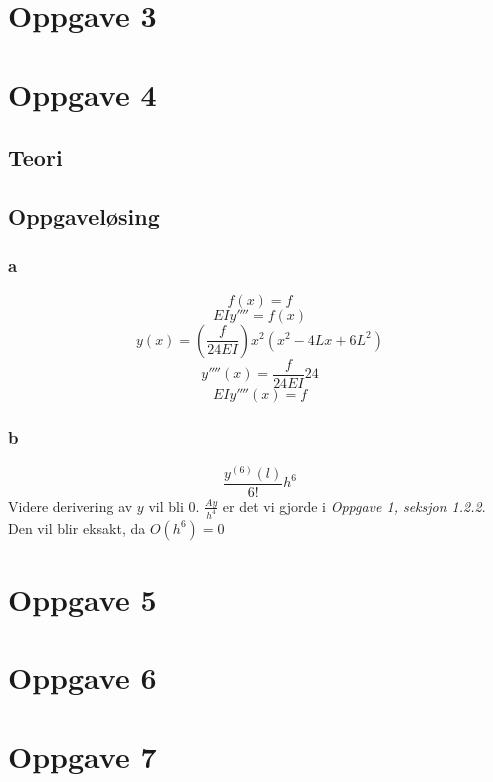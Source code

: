 \documentclass{article}
\begin{document}
    \section{Oppgave 3}

    \section{Oppgave 4}
    \subsection{Teori}

    \subsection{Oppgaveløsing}

    \subsubsection{a}
    \[f(x) = f\]
    \[EIy''''=f(x)\]
    \[y(x)=(\frac{f}{24EI})x^2(x^2-4Lx+6L^2)\]
    \[y''''(x) = \frac{f}{24EI}24\]
    \[EIy''''(x) = f\]
    \subsubsection{b}
    \[\frac{y^{(6)}(l)}{6!}h^6\]
    Videre derivering av $y$ vil bli $0$. 
    $\frac{Ay}{h^4}$ er det vi gjorde i \emph{Oppgave 1, seksjon 1.2.2}.  
    Den vil blir eksakt, da $O(h^6) = 0$
    \section{Oppgave 5}

    \section{Oppgave 6}

    \section{Oppgave 7}

    
   

    

        

        
\end{document}
